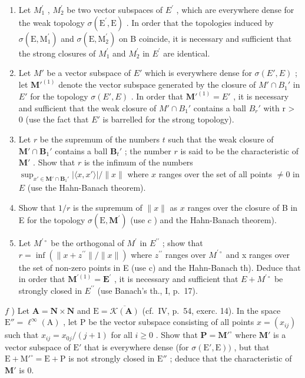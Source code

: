 \begin{enumerate}
\def\labelenumi{\alph{enumi})}
\item
  Let \(M_{1}^{\prime}\) , \(M_{2}^{\prime}\) be two vector subspaces of \(E^{\prime}\) , which are everywhere dense for the weak topology \(\sigma(\mathrm{E}^{\prime}, \mathrm{E})\) . In order that the topologies induced by \(\sigma(\mathrm{E}, \mathrm{M}_{1}^{\prime})\) and \(\sigma(\mathrm{E}, \mathrm{M}_{2}^{\prime})\) on B coincide, it is necessary and sufficient that the strong closures of \(M_{1}^{\prime}\) and \(M_{2}^{\prime}\) in \(E^{\prime}\) are identical.
\item
  Let \(M'\) be a vector subspace of \(E'\) which is everywhere dense for \(\sigma(E', E)\) ; let \(\mathbf{M}'^{(1)}\) denote the vector subspace generated by the closure of \(M' \cap B_{1}'\) in \(E'\) for the topology \(\sigma(E', E)\) . In order that \(\mathbf{M}'^{(1)} = E'\) , it is necessary and sufficient that the weak closure of \(M' \cap B_{1}'\) contains a ball \(B_{r}'\) with r \textgreater{} 0 (use the fact that \(E'\) is barrelled for the strong topology).
\item
  Let \(r\) be the supremum of the numbers \(t\) such that the weak closure of \(\mathbf{M}' \cap \mathbf{B}_1'\) contains a ball \(\mathbf{B}_t'\) ; the number \(r\) is said to be the characteristic of \(\mathbf{M}'\) . Show that \(r\) is the infimum of the numbers \(\sup_{x' \in \mathbf{M}' \cap \mathbf{B}_1'} |\langle x, x' \rangle| / \| x\|\) where \(x\) ranges over the set of all points \(\neq 0\) in \(E\) (use the Hahn-Banach theorem).
\item
  Show that \(1 / r\) is the supremum of \(\| x\|\) as \(x\) ranges over the closure of B in E for the topology \(\sigma (\mathrm{E},\mathbf{M}^{\prime})\) (use \(c\) ) and the Hahn-Banach theorem).
\item
  Let \(M^{\prime\circ}\) be the orthogonal of \(M^{\prime}\) in \(E^{\prime\prime}\) ; show that \(r = \inf(\|x + z^{\prime\prime}\|/\|x\|)\) where \(z^{\prime\prime}\) ranges over \(M^{\prime\circ}\) and x ranges over the set of non-zero points in E (use c) and the Hahn-Banach th). Deduce that in order that \(\mathbf{M}^{\prime(1)} = \mathbf{E}^{\prime}\) , it is necessary and sufficient that \(E + M^{\prime\circ}\) be strongly closed in \(E^{\prime\prime}\) (use Banach's th., I, p.~17).
\end{enumerate}

\(f\) ) Let \(\mathbf{A} = \mathbf{N}\times \mathbf{N}\) and \(\mathrm{E} = \overline{\mathcal{K}(\mathbf{A})}\) (cf.~IV, p.~54, exerc. 14). In the space \(\mathrm{E}'' = \ell^{\infty}(\mathrm{A})\) , let \(\mathrm{P}\) be the vector subspace consisting of all points \(x = (x_{ij})\) such that \(x_{ij} = x_{0j} / (j + 1)\) for all \(i\geqslant 0\) . Show that \(\mathbf{P} = \mathbf{M}'^{\circ}\) where \(\mathbf{M}'\) is a vector subspace of \(\mathrm{E}'\) that is everywhere dense (for \(\sigma (\mathrm{E}',\mathrm{E}))\) , but that \(\mathrm{E} + \mathrm{M}'^{\circ} = \mathrm{E} + \mathrm{P}\) is not strongly closed in \(\mathrm{E}''\) ; deduce that the characteristic of \(\mathbf{M}'\) is 0.

